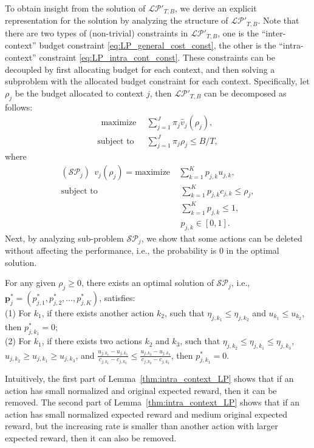 To obtain insight from the solution of ${\mathcal{LP}}'_{T,B}$, we derive an explicit representation for the solution by analyzing the structure of ${\mathcal{LP}}'_{T,B}$. Note that there are two types of (non-trivial) constraints in ${\mathcal{LP}}'_{T,B}$, one is the ``inter-context'' budget constraint \eqref{eq:LP_general_cost_const}, the other is the ``intra-context'' constraint \eqref{eq:LP_intra_cont_const}. These constraints can be decoupled by first allocating budget for each context, and then solving a subproblem with the allocated budget constraint for each context. Specifically, let $\rho_j$ be the budget allocated to context $j$, then ${\mathcal{LP}}'_{T,B}$ can be decomposed as follows:
\begin{align}
~~\text{maximize} &~~ \sum_{j = 1}^J \pi_j \hat{v}_j(\rho_j),  \nonumber\\
\text{subject to} &~~ \sum_{j = 1}^J \pi_j \rho_j \leq  B/T,  \nonumber
\end{align}
where
\begin{align}
(\mathcal{SP}_j)~~v_j(\rho_j) = \text{maximize} &~ \sum_{k = 1}^K p_{j,k} u_{j,k},  \\
\text{subject to} &~~ \sum_{k = 1}^K p_{j,k} c_{j,k} \leq \rho_j, \\
&~~\sum_{k = 1}^K p_{j,k} \leq 1,   \\
&~~ p_{j,k} \in [0,1].\nonumber
\end{align}
Next, by analyzing sub-problem $\mathcal{SP}_j$, we show that some actions can be deleted without affecting the performance, i.e., the probability is 0 in the optimal solution.
\begin{lemma} \label{thm:intra_context_LP}
For any given $\rho_j \geq 0$, there exists an optimal solution of $\mathcal{SP}_j$, i.e.,  $\boldsymbol{p}^*_j = (p^*_{j, 1}, p^*_{j, 2}, \ldots, p^*_{j,K})$, satisfies:\\
(1) For $k_1$, if there exists another action $k_2$, such that $\eta_{j, k_1} \leq \eta_{j, k_2}$ and $u_{k_1} \leq u_{k_2}$, then $p^*_{j, k_1} = 0$;\\
(2) For $k_1$, if there exists two actions $k_2$ and $k_3$, such that $\eta_{j, k_2} \leq \eta_{j, k_1} \leq \eta_{j, k_3}$, $u_{j,k_2}\geq u_{j,k_1} \geq u_{j,k_3}$, and $\frac{u_{j, k_1} - u_{j,k_3}}{c_{j, k_1} - c_{j,k_3}} \leq \frac{u_{j, k_2} - u_{j,k_3}}{c_{j, k_2} - c_{j,k_3}}$, then $p^*_{j, k_1} = 0$.
\end{lemma}
Intuitively, the first part of Lemma~\ref{thm:intra_context_LP} shows that if an action has small normalized and original expected reward, then it can be removed. The second part of Lemma~\ref{thm:intra_context_LP} shows that if an action has small normalized expected reward and medium original expected reward, but the increasing rate is smaller than another action with larger expected reward, then it can also be removed.
